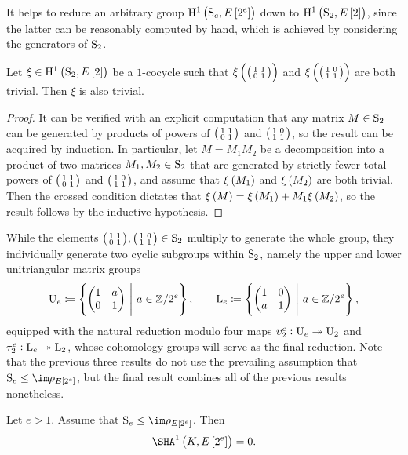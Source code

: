 It helps to reduce an arbitrary group $ \HE[2^e]{\S_e} $ down to $ \HE[2]{\S_2} $, since the latter can be reasonably computed by hand, which is achieved by considering the generators of $ \S_2 $.

\begin{lemma}
\label{lem:trivialgenerators}
Let $ \xi \in \HE[2]{\S_2} $ be a $ 1 $-cocycle such that $ \xi\br{\twobytwosmall{1}{1}{0}{1}} $ and $ \xi\br{\twobytwosmall{1}{0}{1}{1}} $ are both trivial. Then $ \xi $ is also trivial.
\end{lemma}

\begin{proof}
It can be verified with an explicit computation that any matrix $ M \in \S_2 $ can be generated by products of powers of $ \twobytwosmall{1}{1}{0}{1} $ and $ \twobytwosmall{1}{0}{1}{1} $, so the result can be acquired by induction. In particular, let $ M = M_1M_2 $ be a decomposition into a product of two matrices $ M_1, M_2 \in \S_2 $ that are generated by strictly fewer total powers of $ \twobytwosmall{1}{1}{0}{1} $ and $ \twobytwosmall{1}{0}{1}{1} $, and assume that $ \xi\br{M_1} $ and $ \xi\br{M_2} $ are both trivial. Then the crossed condition dictates that $ \xi\br{M} = \xi\br{M_1} + M_1\xi\br{M_2} $, so the result follows by the inductive hypothesis.
\end{proof}

While the elements $ \twobytwosmall{1}{1}{0}{1}, \twobytwosmall{1}{0}{1}{1} \in \S_2 $ multiply to generate the whole group, they individually generate two cyclic subgroups within $ \S_2 $, namely the upper and lower unitriangular matrix groups
$$ \U_e \coloneqq \cbr{\twobytwo{1}{a}{0}{1} \st a \in \ZZ / 2^e}, \qquad \L_e \coloneqq \cbr{\twobytwo{1}{0}{a}{1} \st a \in \ZZ / 2^e}, $$
equipped with the natural reduction modulo four maps $ \upsilon_2^e : \U_e \twoheadrightarrow \U_2 $ and $ \tau_2^e : \L_e \twoheadrightarrow \L_2 $, whose cohomology groups will serve as the final reduction. Note that the previous three results do not use the prevailing assumption that $ \S_e \le \im \rho_{E\sbr{2^e}} $, but the final result combines all of the previous results nonetheless.

\pagebreak

\begin{proposition}
\label{prop:vanishingspecial}
Let $ e > 1 $. Assume that $ \S_e \le \im \rho_{E\sbr{2^e}} $. Then
$$ \Sha[K, E\sbr{2^e}] = 0. $$
\end{proposition}

